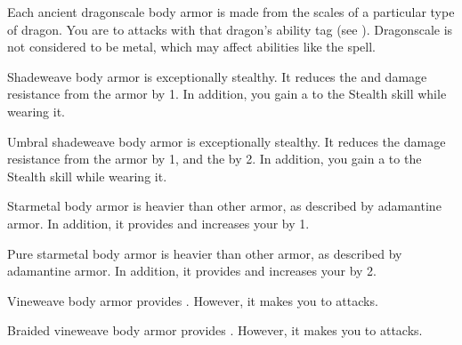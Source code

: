        Each ancient dragonscale body armor is made from the scales of a particular type of dragon.
      You are  to attacks with that dragon's ability tag (see ).
      Dragonscale is not considered to be metal, which may affect abilities like the  spell.

       Shadeweave body armor is exceptionally stealthy.
      It reduces the  and damage resistance from the armor by 1.
      In addition, you gain a   to the Stealth skill while wearing it.

       Umbral shadeweave body armor is exceptionally stealthy.
      It reduces the damage resistance from the armor by 1, and the  by 2.
      In addition, you gain a   to the Stealth skill while wearing it.

       Starmetal body armor is heavier than other armor, as described by adamantine armor.
      In addition, it provides   and increases your  by 1.

       Pure starmetal body armor is heavier than other armor, as described by adamantine armor.
      In addition, it provides   and increases your  by 2.

       Vineweave body armor provides  .
      However, it makes you \vulnerable to \atFire attacks.

       Braided vineweave body armor provides  .
      However, it makes you \vulnerable to \atFire attacks.

